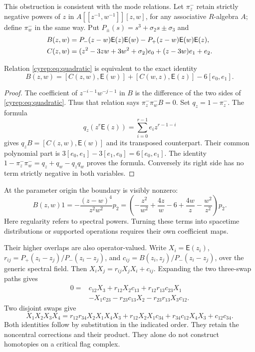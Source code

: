 This obstruction is consistent with the mode relations.
Let \(\pi_z^-\) retain strictly negative powers of \(z\) in
\(A[[z^{-1},w^{-1}]][z,w]\), for any associative \(R\)-algebra
\(A\); define \(\pi_w^-\) in the same way.
Put \(P_\pm(s)=s^3+\sigma_2s\pm\sigma_3\) and
\begin{align}
 B(z,w)&=P_-(z-w)\mathsf E(z)\mathsf E(w)
             -P_+(z-w)\mathsf E(w)\mathsf E(z),\notag\\
 C(z,w)&=(z^2-3zw+3w^2+\sigma_2)e_0
                          +(z-3w)e_1+e_2.\label{cyrep:eq:C}
\end{align}

\begin{proposition}\label{cyrep:prop:boundary}
Relation \eqref{cyrep:eq:quadratic} is equivalent to the exact identity
\begin{equation}\label{cyrep:eq:boundary}
 B(z,w)=[C(z,w),\mathsf E(w)]
              +[C(w,z),\mathsf E(z)]-6[e_0,e_1].
\end{equation}
\end{proposition}

\begin{proof}
The coefficient of \(z^{-i-1}w^{-j-1}\) in \(B\) is the
difference of the two sides of \eqref{cyrep:eq:quadratic}.
Thus that relation says \(\pi_z^-\pi_w^-B=0\).
Set \(q_z=1-\pi_z^-\). The formula
\[
 q_z(z^r\mathsf E(z))=\sum_{i=0}^{r-1}e_i z^{r-1-i}
\]
gives \(q_zB=[C(z,w),\mathsf E(w)]\) and its transposed
counterpart. Their common polynomial part is
\(3[e_0,e_1]-3[e_1,e_0]=6[e_0,e_1]\).
The identity \(1-\pi_z^-\pi_w^-=q_z+q_w-q_zq_w\)
proves the formula. Conversely its right side has no term
strictly negative in both variables.
\end{proof}

At the parameter origin the boundary is visibly nonzero:
\[
 B(z,w)1=-\frac{(z-w)^4}{z^2w^2}p_2
 =\left(-\frac{z^2}{w^2}+\frac{4z}{w}-6
                         +\frac{4w}{z}-\frac{w^2}{z^2}\right)p_2.
\]
Here regularity refers to spectral powers. Turning these terms
into spacetime distributions or supported operations requires
their own coefficient maps.

Their higher overlaps are also operator-valued. Write
\(X_i=\mathsf E(z_i)\),
\(r_{ij}=P_+(z_i-z_j)/P_-(z_i-z_j)\), and
\(c_{ij}=B(z_i,z_j)/P_-(z_i-z_j)\), over the generic spectral field.
Then \(X_iX_j=r_{ij}X_jX_i+c_{ij}\).
Expanding the two three-swap paths gives
\begin{equation}\label{cyrep:eq:triple-overlap}
\begin{split}
 0={}&c_{12}X_3+r_{12}X_2c_{13}
                     +r_{12}r_{13}c_{23}X_1\\
 &-X_1c_{23}-r_{23}c_{13}X_2
                     -r_{23}r_{13}X_3c_{12}.
\end{split}
\end{equation}
Two disjoint swaps give
\[
 X_1X_2X_3X_4
 =r_{12}r_{34}X_2X_1X_4X_3
 +r_{12}X_2X_1c_{34}+r_{34}c_{12}X_4X_3+c_{12}c_{34}.
\]
Both identities follow by substitution in the indicated order.
They retain the noncentral corrections and their product.
They alone do not construct homotopies on a critical flag complex.

